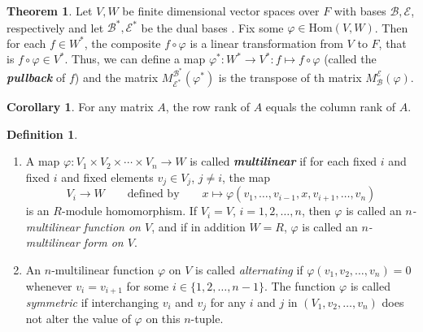 \documentclass[10pt]{article}
\theoremstyle{definition}
\newtheorem{thm}{Theorem}[section]
\newtheorem*{cor}{Corollary}
\newtheorem*{defn}{Definition}
\newcommand{\nl}{\vspace{7em}}
\newcommand{\ra}{\rightarrow}
\newcommand{\vphi}{\varphi}
\newcommand{\Hom}{\text{Hom}}
\newcommand{\BB}{\mathcal{B}}
\newcommand{\EE}{\mathcal{E}}
\begin{document}
\nl

\begin{thm}
Let $V,W$ be finite dimensional vector spaces over $F$ with bases $\BB, \EE$, respectively and let $\BB^*,\EE^*$ be the dual bases . Fix some $\vphi\in \Hom(V,W)$. Then for each $f\in W^*$, the composite $f\circ \vphi$ is a linear transformation from $V$ to $F$, that is $f\circ \vphi\in V^*$. Thus, we can define a map $\vphi^*:W^* \ra V^*:f\mapsto f\circ \vphi$ (called the \textit{\textbf{pullback}} of $f$) and the matrix $M_{\EE^*}^{\BB^*}(\vphi^*)$ is the transpose of th matrix $M_\BB^\EE(\vphi)$.
\end{thm}

\nl

\begin{cor}
For any matrix $A$, the row rank of $A$ equals the column rank of $A$.
\end{cor}

\nl

\begin{defn}\nl
\begin{enumerate}
\item A map $\vphi:V_1\times V_2\times \cdots \times V_n\ra W$ is called \textit{\textbf{multilinear}} if for each fixed $i$ and fixed $i$ and fixed elements $v_j\in V_j$, $j\neq i$, the map
\[V_i \ra W\qquad \text{defined by}\qquad x\mapsto \vphi(v_1,\ldots,v_{i-1},x,v_{i+1},\ldots, v_n)\]
is an $R$-module homomorphism. If $V_i = V$, $i = 1,2,\ldots, n$, then $\vphi$ is called an $n$\textit{-multilinear function on $V$}, and if in addition $W = R$, $\vphi$ is called an \textit{$n$-multilinear form on $V$}.

\item An $n$-multilinear function $\vphi$ on $V$ is called \textit{alternating} if $\vphi(v_1, v_2,\ldots, v_n) = 0$ whenever $v_i = v_{i + 1}$ for some $i\in \{1,2,\ldots, n-1\}$. The function $\vphi$ is called \textit{symmetric} if interchanging $v_i$ and $v_j$ for any $i$ and $j$ in $(V_1,v_2,\ldots, v_n)$ does not alter the value of $\vphi$ on this $n$-tuple.
\end{enumerate}
\end{defn}

\nl
\end{document}
